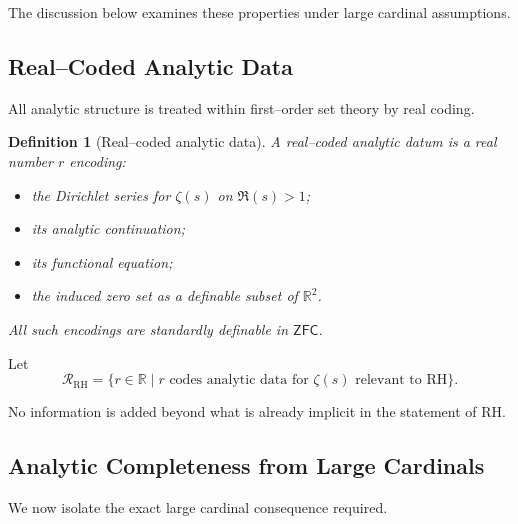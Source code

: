 \documentclass{article}
\newtheorem{definition}[theorem]{Definition}
\theoremstyle{definition}
\begin{document}
The discussion below examines these properties under large cardinal assumptions.

\subsection{Real--Coded Analytic Data}

All analytic structure is treated within first--order set theory by real coding.

\begin{definition}[Real--coded analytic data]
A real--coded analytic datum is a real number $r$ encoding:
\begin{itemize}
\item the Dirichlet series for $\zeta(s)$ on $\Re(s)>1$;
\item its analytic continuation;
\item its functional equation;
\item the induced zero set as a definable subset of $\mathbb{R}^2$.
\end{itemize}
All such encodings are standardly definable in $\mathsf{ZFC}$.
\end{definition}

Let
\[
\mathcal{R}_{\mathrm{RH}}
=
\{ r \in \mathbb{R} \mid r \text{ codes analytic data for } \zeta(s)
\text{ relevant to RH} \}.
\]

No information is added beyond what is already implicit in the statement of RH.

\subsection{Analytic Completeness from Large Cardinals}

We now isolate the exact large cardinal consequence required.
\end{document}
